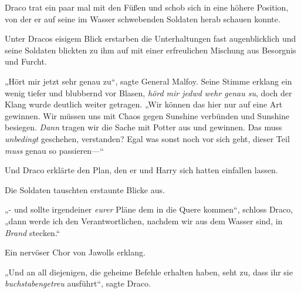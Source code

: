 Draco trat ein paar mal mit den Füßen und schob sich in eine höhere Position, von der er auf seine im Wasser schwebenden Soldaten herab schauen konnte.

Unter Dracos eisigem Blick erstarben die Unterhaltungen fast augenblicklich und seine Soldaten blickten zu ihm auf mit einer erfreulichen Mischung aus Besorgnis und Furcht.

„Hört mir jetzt sehr genau zu“, sagte General Malfoy. Seine Stimme erklang ein wenig tiefer und blubbernd vor Blasen, \emph{hörd mir jedwd} \emph{wehr genau su}, doch der Klang wurde deutlich weiter getragen. „Wir können das hier nur auf eine Art gewinnen. Wir müssen uns mit Chaos gegen Sunshine verbünden und Sunshine besiegen. \emph{Dann} tragen wir die Sache mit Potter aus und gewinnen. Das muss \emph{unbedingt} geschehen, verstanden? Egal was sonst noch vor sich geht, dieser Teil \emph{muss} genau so passieren—“

Und Draco erklärte den Plan, den er und Harry sich hatten einfallen lassen.

Die Soldaten tauschten erstaunte Blicke aus.

„- und sollte irgendeiner \emph{eurer} Pläne dem in die Quere kommen“, schloss Draco, „dann werde ich den Verantwortlichen, nachdem wir aus dem Wasser sind, in \emph{Brand} stecken.“

Ein nervöser Chor von Jawolls erklang.

„Und an all diejenigen, die geheime Befehle erhalten haben, seht zu, dass ihr sie \emph{buchstabengetreu} ausführt“, sagte Draco.

